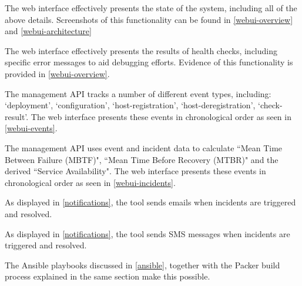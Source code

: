 \documentclass{cshonours}
\begin{document}
\begin{enumerate}
\begin{enumerate}
      The web interface effectively presents the state of the system, including all of the above details. Screenshots of this functionality can be found in \autoref{webui-overview} and \autoref{webui-architecture}


      The web interface effectively presents the results of health checks, including specific error messages to aid debugging efforts. Evidence of this functionality is provided in \autoref{webui-overview}.


        The management API tracks a number of different event types, including: `deployment', `configuration', `host-registration', `host-deregistration', `check-result'. The web interface presents these events in chronological order as seen in \autoref{webui-events}.


        The management API uses event and incident data to calculate ``Mean Time Between Failure (MBTF)", ``Mean Time Before Recovery (MTBR)" and the derived ``Service Availability". The web interface presents these events in chronological order as seen in \autoref{webui-incidents}.


        As displayed in \autoref{notifications}, the tool sends emails when incidents are triggered and resolved.


        As displayed in \autoref{notifications}, the tool sends SMS messages when incidents are triggered and resolved.


        The Ansible playbooks discussed in \autoref{ansible}, together with the Packer build process explained in the same section make this possible.

    \end{enumerate}
\end{enumerate}
\end{document}
